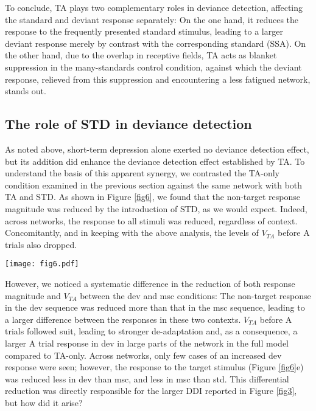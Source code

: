 \documentclass[pdflatex,referee,iicol,sn-basic]{sn-jnl}
\theoremstyle{thmstyleone}%
\theoremstyle{thmstyletwo}%
\theoremstyle{thmstylethree}%
\begin{document}
To conclude, TA plays two complementary roles in deviance detection, affecting the standard and deviant response separately: On the one hand, it reduces the response to the frequently presented standard stimulus, leading to a larger deviant response merely by contrast with the corresponding standard (SSA). On the other hand, due to the overlap in receptive fields, TA acts as blanket suppression in the many-standards control condition, against which the deviant response, relieved from this suppression and encountering a less fatigued network, stands out.

\subsection{The role of STD in deviance detection}\label{sec-std}

As noted above, short-term depression alone exerted no deviance detection effect, but its addition did enhance the deviance detection effect established by TA. To understand the basis of this apparent synergy, we contrasted the TA-only condition examined in the previous section against the same network with both TA and STD. As shown in Figure \ref{fig6}, we found that the non-target response magnitude was reduced by the introduction of STD, as we would expect. Indeed, across networks, the response to all stimuli was reduced, regardless of context. Concomitantly, and in keeping with the above analysis, the levels of $V_{TA}$ before A trials also dropped.

\begin{figure*}%
    \centering
    \texttt{[image: fig6.pdf]}
    \caption{}
    \label{fig6}
\end{figure*}

However, we noticed a systematic difference in the reduction of both response magnitude and $V_{TA}$ between the dev and msc conditions: The non-target response in the dev sequence was reduced more than that in the msc sequence, leading to a larger difference between the responses in these two contexts. $V_{TA}$ before A trials followed suit, leading to stronger de-adaptation and, as a consequence, a larger A trial response in dev in large parts of the network in the full model compared to TA-only. Across networks, only few cases of an increased dev response were seen; however, the response to the target stimulus (Figure \ref{fig6}e) was reduced less in dev than msc, and less in msc than std. This differential reduction was directly responsible for the larger DDI reported in Figure \ref{fig3}, but how did it arise?
\end{document}
